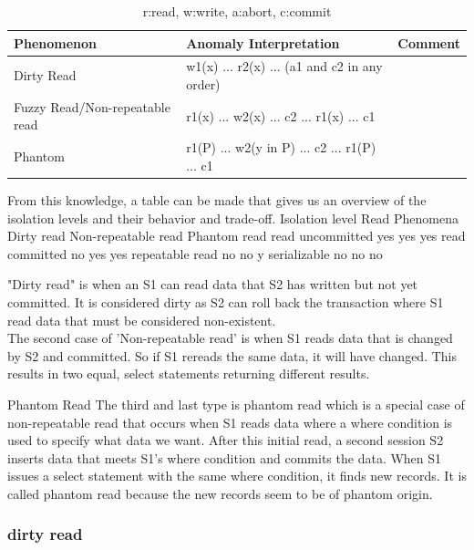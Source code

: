 \documentclass[a4paper,10pt,titlepage]{report}
\begin{document}
    \begin{table}[h]
        \begin{tabular}{|l|l|l|}
            \hline
            Phenomenon                     & Anomaly Interpretation                       & Comment \\\hline
            Dirty Read                     & w1(x) ... r2(x) ... (a1 and c2 in any order) &         \\\hline
            Fuzzy Read/Non-repeatable read & r1(x) ... w2(x) ... c2 ... r1(x) ... c1      &         \\\hline
            Phantom                        & r1(P) ... w2(y in P) ... c2 ... r1(P) ... c1 &         \\ \hline
        \end{tabular}
        \caption{r:read, w:write, a:abort, c:commit}
    \end{table}


From this knowledge, a table can be made that gives us an overview of the isolation levels and their behavior and trade-off.
Isolation level	Read Phenomena
Dirty read	Non-repeatable read	Phantom read
read uncommitted	yes	yes	yes
read committed	no	yes	yes
repeatable read	no	no	y
serializable	no	no	no


"Dirty read" is when an S1 can read data that S2 has written but not yet committed. It is considered dirty as S2 can roll back the transaction where S1 read data that must be considered non-existent. %
\\
The second case of 'Non-repeatable read' is when S1 reads data that is changed by S2 and committed. So if S1 rereads the same data, it will have changed. This results in two equal, select statements returning different results.  

Phantom Read
The third and last type is phantom read which is a special case of non-repeatable read that occurs when S1 reads data where a  where condition is used to specify what data we want. After this initial read, a second session S2 inserts data that meets S1's where condition and commits the data. When S1 issues a select statement with the same where condition, it finds new records. It is called phantom read because the new records seem to be of phantom origin.


    \subsubsection{dirty read}
\end{document}
